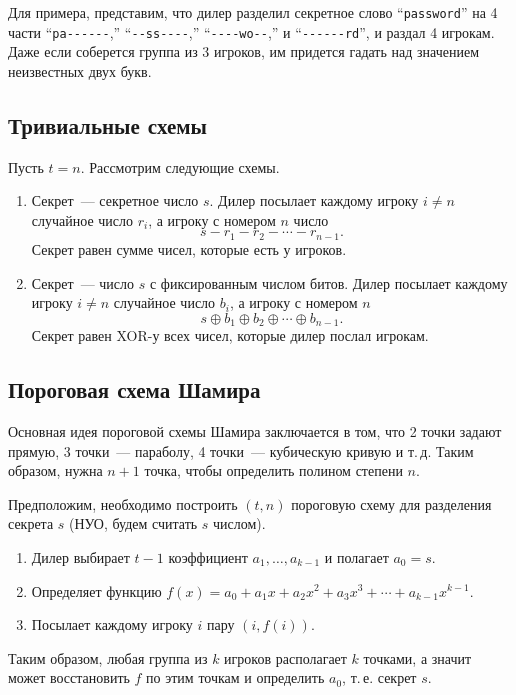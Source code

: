 \documentclass[a4paper,10pt]{article}
\begin{document}
Для примера, представим, что дилер разделил секретное слово ``\texttt{password}'' 
на 4 части ``\texttt{pa-{-}-{-}-{-}},'' ``\texttt{-{-}ss-{-}-{-}},'' ``\texttt{-{-}-{-}wo-{-}},'' и
``\texttt{-{-}-{-}-{-}rd}'', и раздал 4 игрокам.
Даже если соберется группа из 3 игроков, им придется гадать над значением неизвестных двух букв.

\subsection{Тривиальные схемы}
Пусть $t = n$. 
Рассмотрим следующие схемы.

\begin{enumerate}
    \item Секрет~--- секретное число $s$.
        Дилер посылает каждому игроку $i\neq n$ случайное число $r_i$, а игроку с номером $n$
        число $$s - r_1 - r_2 - \cdots - r_{n - 1}.$$
        Секрет равен сумме чисел, которые есть у игроков.

    \item Секрет~--- число $s$ с фиксированным числом битов.
        Дилер посылает каждому игроку $i\neq n$ случайное число $b_i$, а игроку
        с номером $n$ $$s\oplus b_1\oplus b_2 \oplus\cdots \oplus b_{n-1}.$$
        Секрет равен XOR-у всех чисел, которые дилер послал игрокам.
\end{enumerate}

\subsection{Пороговая схема Шамира}
Основная идея пороговой схемы Шамира заключается в том, что 2 точки задают прямую,
3 точки~--- параболу, 4 точки~--- кубическую кривую и т.\,д.
Таким образом, нужна $n+1$ точка, чтобы определить полином степени $n$.

Предположим, необходимо построить $(t,n)$ пороговую схему для разделения секрета $s$ (НУО, будем
считать $s$ числом).

\begin{enumerate}
    \item Дилер выбирает $t-1$ коэффициент $a_1,\ldots, a_{k-1}$ и полагает $a_0 = s$.
    \item Определяет функцию $f(x)=a_0+a_1x+a_2x^2+a_3x^3+\cdots+a_{k-1}x^{k-1}$.
    \item Посылает каждому игроку $i$ пару $(i, f(i))$.
\end{enumerate}
Таким образом, любая группа из $k$ игроков располагает $k$ точками, 
а значит может восстановить $f$ по этим точкам и определить $a_0$, т.\,е. секрет $s$.
\end{document}
